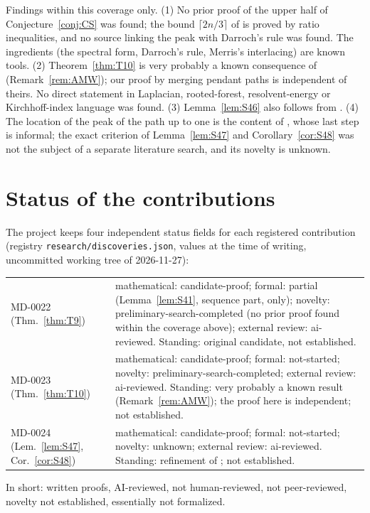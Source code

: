 \documentclass[11pt]{amsart}
\theoremstyle{definition}
\theoremstyle{remark}
\begin{document}
Findings within this coverage only.
(1) No prior proof of the upper half of Conjecture~\ref{conj:CS} was found;
the bound $\lceil 2n/3\rceil$ of \cite[Theorem~3.3]{AAB} is proved by ratio
inequalities, and no source linking the peak with Darroch's rule was found.
The ingredients (the spectral form, Darroch's rule, Merris's interlacing) are
known tools.
(2) Theorem~\ref{thm:T10} is very probably a known consequence of
\cite[Theorem~4.4]{AMW} (Remark~\ref{rem:AMW}); our proof by merging pendant
paths is independent of theirs. No direct statement in Laplacian,
rooted-forest, resolvent-energy or Kirchhoff-index language was found.
(3) Lemma~\ref{lem:S46} also follows from \cite[Lemma~4.2]{AMW}.
(4) The location of the peak of the path up to one is the content of
\cite[Theorem~3]{Col89}, whose last step is informal; the exact criterion of
Lemma~\ref{lem:S47} and Corollary~\ref{cor:S48} was not the subject of a
separate literature search, and its novelty is unknown.

\section*{Status of the contributions}

The project keeps four independent status fields for each registered
contribution (registry \nolinkurl{research/discoveries.json}, values at the time
of writing, uncommitted working tree of 2026-11-27):

\smallskip
\noindent\begin{tabular}{@{}p{}p{}@{}}
MD-0022 (Thm.~\ref{thm:T9}) & mathematical: candidate-proof; formal: partial (Lemma~\ref{lem:S41}, sequence part, only); novelty: preliminary-search-completed (no prior proof found within the coverage above); external review: ai-reviewed. Standing: original candidate, not established.\\[0.5ex]
MD-0023 (Thm.~\ref{thm:T10}) & mathematical: candidate-proof; formal: not-started; novelty: preliminary-search-completed; external review: ai-reviewed. Standing: very probably a known result (Remark~\ref{rem:AMW}); the proof here is independent; not established.\\[0.5ex]
MD-0024 (Lem.~\ref{lem:S47}, Cor.~\ref{cor:S48}) & mathematical: candidate-proof; formal: not-started; novelty: unknown; external review: ai-reviewed. Standing: refinement of \cite[Theorem~3]{Col89}; not established.
\end{tabular}
\smallskip

\noindent In short: written proofs, AI-reviewed, not human-reviewed, not
peer-reviewed, novelty not established, essentially not formalized.
\end{document}
